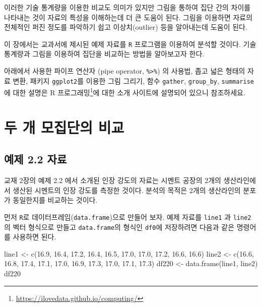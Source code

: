 \documentclass[
]{book}
\makeatletter
\newenvironment{Shaded}{\begin{snugshade}}{\end{snugshade}}
\newcommand{\FloatTok}[1]{\textcolor[rgb]{0.00,0.00,0.81}{#1}}
\newcommand{\FunctionTok}[1]{\textcolor[rgb]{0.00,0.00,0.00}{#1}}
\newcommand{\NormalTok}[1]{#1}
\newcommand{\OtherTok}[1]{\textcolor[rgb]{0.56,0.35,0.01}{#1}}
\renewcommand{\href}[2]{#2\footnote{\url{#1}}}
\newenvironment{kframe}{%
\medskip{}
\setlength{\fboxsep}{.8em}
 \def\at@end@of@kframe{}%
 \ifinner\ifhmode%
  \def\at@end@of@kframe{\end{minipage}}%
  \begin{minipage}{\columnwidth}%
 \fi\fi%
 \def\FrameCommand##1{\hskip\@totalleftmargin \hskip-\fboxsep
 \colorbox{shadecolor}{##1}\hskip-\fboxsep
     \hskip-\linewidth \hskip-\@totalleftmargin \hskip\columnwidth}%
 \MakeFramed {\advance\hsize-\width
   \@totalleftmargin\z@ \linewidth\hsize
   \@setminipage}}%
 {\par\unskip\endMakeFramed%
 \at@end@of@kframe}
\newenvironment{rmdblock}[1]
  {
  \begin{itemize}
  \renewcommand{\labelitemi}{
    \raisebox{-.7\height}[0pt][0pt]{
      {\setkeys{Gin}{width=3em,keepaspectratio}\texttt{[image: images/\#1]}}
    }
  }
  \setlength{\fboxsep}{1em}
  \begin{kframe}
  \item
  }
  {
  \end{kframe}
  \end{itemize}
  }
\newenvironment{rmdnote}
  {\begin{rmdblock}{note}}
  {\end{rmdblock}}
\makeatother
\begin{document}
이러한 기술 통계량을 이용한 비교도 의미가 있지만 그림을 통하여 집단 간의 차이를 나타내는 것이 자료의 특성을 이해하는데 더 큰 도움이 된다. 그림을 이용하면 자료의 전체적인 퍼진 정도를 파악하기 쉽고 이상치(outlier) 등을 알아내는데 도움이 된다.

이 장에서는 교과서에 제시된 예제 자료를 \texttt{R} 프로그램을 이용하여 분석할 것이다. 기술 통계량과 그림을 이용하여 집단을 비교하는 방법을 알아보고자 한다.

\begin{rmdnote}
아래에서 사용한 파이프 연산자 (pipe operator, \texttt{\%\textgreater{}\%}) 의 사용법, 좁고 넓은 형태의 자료 변환, 패키지 \texttt{ggplot2}를 이용한 그림 그리기, 함수 \texttt{gather}, \texttt{group\_by}, \texttt{summarise} 에 대한 설명은 \href{https://ilovedata.github.io/computing/}{R 프로그래밍}에 대한 소개 사이트에 설명되어 있으니 참조하세요.\\
\end{rmdnote}

\hypertarget{uxb450-uxac1c-uxbaa8uxc9d1uxb2e8uxc758-uxbe44uxad50}{%
\section{두 개 모집단의 비교}\label{uxb450-uxac1c-uxbaa8uxc9d1uxb2e8uxc758-uxbe44uxad50}}

\hypertarget{uxc608uxc81c-2.2-uxc790uxb8cc}{%
\subsection{예제 2.2 자료}\label{uxc608uxc81c-2.2-uxc790uxb8cc}}

교재 2장의 예제 2.2 에서 소개된 인장 강도의 자료는 시멘트 공장의 2개의 생산라인에서 생산된 시멘트의 인장 강도를 측정한 것이다. 분석의 목적은 2개의 생산라인의 분포가 동일한지를 비교하는 것이다.

먼저 \texttt{R}로 데이터프레임(\texttt{data.frame})으로 만들어 보자. 예제 자료를 \texttt{line1} 과 \texttt{line2} 의 벡터 형식으로 만들고 \texttt{data.frame}의 형식인 \texttt{df0}에 저장하려면 다음과 같은 명령어를 사용하면 된다.

\begin{Shaded}
\begin{Highlighting}[]
\NormalTok{line1 }\OtherTok{\textless{}{-}} \FunctionTok{c}\NormalTok{(}\FloatTok{16.9}\NormalTok{, }\FloatTok{16.4}\NormalTok{, }\FloatTok{17.2}\NormalTok{, }\FloatTok{16.4}\NormalTok{, }\FloatTok{16.5}\NormalTok{, }\FloatTok{17.0}\NormalTok{, }\FloatTok{17.0}\NormalTok{, }\FloatTok{17.2}\NormalTok{, }\FloatTok{16.6}\NormalTok{, }\FloatTok{16.6}\NormalTok{)}
\NormalTok{line2 }\OtherTok{\textless{}{-}} \FunctionTok{c}\NormalTok{(}\FloatTok{16.6}\NormalTok{, }\FloatTok{16.8}\NormalTok{, }\FloatTok{17.4}\NormalTok{, }\FloatTok{17.1}\NormalTok{, }\FloatTok{17.0}\NormalTok{, }\FloatTok{16.9}\NormalTok{, }\FloatTok{17.3}\NormalTok{, }\FloatTok{17.0}\NormalTok{, }\FloatTok{17.1}\NormalTok{, }\FloatTok{17.3}\NormalTok{)}
\NormalTok{df220 }\OtherTok{\textless{}{-}} \FunctionTok{data.frame}\NormalTok{(line1, line2)}
\NormalTok{df220}
\end{Highlighting}
\end{Shaded}
\end{document}
